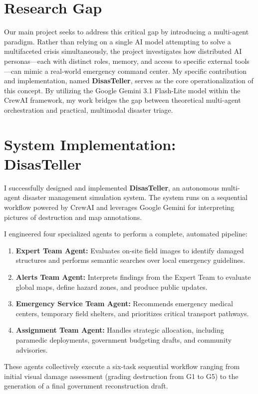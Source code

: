 \documentclass[conference,twocolumn,twoside]{IEEEtran}
\begin{document}
\section{Research Gap}
Our main project seeks to address this critical gap by introducing a multi-agent paradigm. Rather than relying on a single AI model attempting to solve a multifaceted crisis simultaneously, the project investigates how distributed AI personas---each with distinct roles, memory, and access to specific external tools---can mimic a real-world emergency command center. My specific contribution and implementation, named \textbf{DisasTeller}, serves as the core operationalization of this concept. By utilizing the Google Gemini 3.1 Flash-Lite model within the CrewAI framework, my work bridges the gap between theoretical multi-agent orchestration and practical, multimodal disaster triage.

\section{System Implementation: DisasTeller}
I successfully designed and implemented \textbf{DisasTeller}, an autonomous multi-agent disaster management simulation system. The system runs on a sequential workflow powered by CrewAI and leverages Google Gemini for interpreting pictures of destruction and map annotations. 

I engineered four specialized agents to perform a complete, automated pipeline:
\begin{enumerate}
    \item \textbf{Expert Team Agent:} Evaluates on-site field images to identify damaged structures and performs semantic searches over local emergency guidelines.
    \item \textbf{Alerts Team Agent:} Interprets findings from the Expert Team to evaluate global maps, define hazard zones, and produce public updates.
    \item \textbf{Emergency Service Team Agent:} Recommends emergency medical centers, temporary field shelters, and prioritizes critical transport pathways.
    \item \textbf{Assignment Team Agent:} Handles strategic allocation, including paramedic deployments, government budgeting drafts, and community advisories.
\end{enumerate}

These agents collectively execute a six-task sequential workflow ranging from initial visual damage assessment (grading destruction from G1 to G5) to the generation of a final government reconstruction draft.
\end{document}
